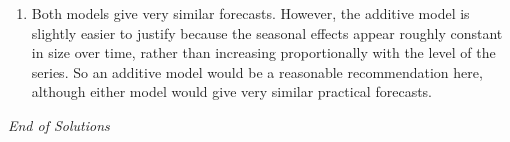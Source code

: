 \documentclass[11pt,a4paper]{article}
\begin{document}
\begin{enumerate}
\item Both models give very similar forecasts.
However, the additive model is slightly easier to justify because the seasonal effects appear roughly constant in size over time, rather than increasing proportionally with the level of the series.
So an additive model would be a reasonable recommendation here, although either model would give very similar practical forecasts.
\end{enumerate}

\vfill

\begin{center}
\textit{End of Solutions}
\end{center}
\end{document}
